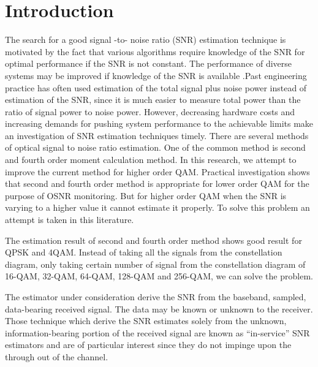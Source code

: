 \documentclass[12pt]{report}
\begin{document}
	\section{Introduction}
	The search for a good signal -to- noise ratio (SNR) estimation technique is motivated by the fact that various algorithms require knowledge of the SNR for optimal performance if the SNR is not constant. The performance of diverse systems may be improved if knowledge of  the SNR is available .Past engineering practice has often used estimation of the total signal plus noise power instead of estimation of the SNR, since it is much easier to measure total power than the ratio of signal power to noise power. However, decreasing hardware costs and increasing demands for pushing system performance to the achievable limits make an investigation of SNR estimation techniques timely. 
	There are several methods of optical signal to noise ratio estimation. One of the common method is second and fourth order moment calculation method. In this research, we attempt to improve the current method for higher order QAM. Practical investigation shows that second and fourth order method is appropriate for lower order QAM for the purpose of OSNR monitoring. But for higher order QAM when the SNR is varying to a higher value it cannot estimate it properly. To solve this problem an attempt is taken in this literature.
	
	
	The estimation result of second and fourth order method shows good result for QPSK and 4QAM. Instead of taking all the signals from the constellation diagram, only taking certain number of signal from the constellation diagram of 16-QAM, 32-QAM, 64-QAM, 128-QAM and 256-QAM, we can solve the problem. 
	
	
	The estimator under consideration derive the SNR from the baseband, sampled, data-bearing received signal. The data may be known or unknown to the receiver. Those technique which derive the SNR estimates solely from the unknown, information-bearing portion of the received signal are known as “in-service” SNR estimators and are of particular interest since they do not impinge upon the through out of the channel.
\end{document}

